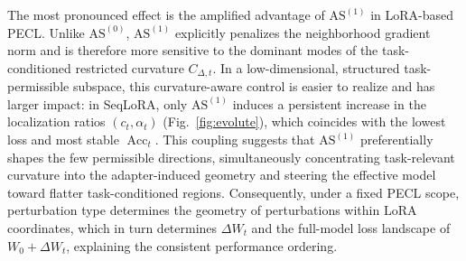\documentclass{article}
\theoremstyle{plain}
\theoremstyle{definition}
\theoremstyle{remark}
\begin{document}


The most pronounced effect is the amplified advantage of $\mathrm{AS}^{(1)}$ in LoRA-based PECL. Unlike $\mathrm{AS}^{(0)}$, $\mathrm{AS}^{(1)}$ explicitly penalizes the neighborhood gradient norm and is therefore more sensitive to the dominant modes of the task-conditioned restricted curvature $C_{\Delta,t}$. In a low-dimensional, structured task-permissible subspace, this curvature-aware control is easier to realize and has larger impact: in SeqLoRA, only $\mathrm{AS}^{(1)}$ induces a persistent increase in the localization ratios $(c_t,\alpha_t)$ (Fig.~\ref{fig:evolute}), which coincides with the lowest loss and most stable $\operatorname{Acc}_t$. This coupling suggests that $\mathrm{AS}^{(1)}$ preferentially shapes the few permissible directions, simultaneously concentrating task-relevant curvature into the adapter-induced geometry and steering the effective model toward flatter task-conditioned regions. Consequently, under a fixed PECL scope, perturbation type determines the geometry of perturbations within LoRA coordinates, which in turn determines $\Delta W_t$ and the full-model loss landscape of $W_0+\Delta W_t$, explaining the consistent performance ordering.
\end{document}
